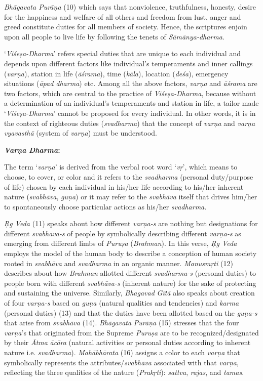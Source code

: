 \emph{Bhāgavata Purāṇa} (10) which says that nonviolence, truthfulness, honesty, desire for the happiness and welfare of all others and freedom from lust, anger and greed constitute duties for all members of society. Hence, the scriptures enjoin upon all people to live life by following the tenets of \emph{Sāmānya-dharma}.

`\emph{Viśeṣa-Dharma}' refers special duties that are unique to each individual and depends upon different factors like individual's temperaments and inner callings (\emph{varṇa}), station in life (\emph{āśrama}), time (\emph{kāla}), location (\emph{deśa}), emergency situations (\emph{āpad dharma}) etc. Among all the above factors, \emph{varṇa} and \emph{āśrama} are two factors, which are central to the practice of \emph{Viśeṣa-Dharma}, because without a determination of an individual's temperaments and station in life, a tailor made `\emph{Viśeṣa-Dharma}' cannot be proposed for every individual. In other words, it is in the context of righteous duties (\emph{svadharma}) that the concept of \emph{varṇa} and \emph{varṇa} \emph{vyavasthā} (system of \emph{varṇa}) must be understood.

\textbf{\emph{Varṇa} \emph{Dharma}:}

The term `\emph{varṇa}' is derived from the verbal root word `\emph{vṛ}', which means to choose, to cover, or color and it refers to the \emph{svadharma} (personal duty/purpose of life) chosen by each individual in his/her life according to his/her inherent nature (\emph{svabhāva}, \emph{guṇa}) or it may refer to the \emph{svabhāva} itself that drives him/her to spontaneously choose particular actions as his/her \emph{svadharma}.

\emph{Ṛg Veda} (11) speaks about how different \emph{varṇa-s} are nothing but designations for different \emph{svabhāva-s} of people by symbolically describing different \emph{varṇa-s} as emerging from different limbs of \emph{Puruṣa} (\emph{Brahman}). In this verse, \emph{Ṛg Veda} employs the model of the human body to describe a conception of human society rooted in \emph{svabhāva} and \emph{svadharma} in an organic manner. \emph{Manusmṛti} (12) describes about how \emph{Brahman} allotted different \emph{svadharma-s} (personal duties) to people born with different \emph{svabhāva-s} (inherent nature) for the sake of protecting and sustaining the universe. Similarly, \emph{Bhagavad} \emph{Gītā} also speaks about creation of four \emph{varṇa-s} based on \emph{guṇa} (natural qualities and tendencies) and \emph{karma} (personal duties) (13) and that the duties have been allotted based on the \emph{guṇa-s} that arise from \emph{svabhāva} (14). \emph{Bhāgavata} \emph{Purāṇa} (15) stresses that the four \emph{varṇa}'s that originated from the Supreme \emph{Puruṣa} are to be recognized/designated by their \emph{Ātma} \emph{ācāra} (natural activities or personal duties according to inherent nature i.e. \emph{svadharma}). \emph{Mahābhārata} (16) assigns a color to each \emph{varṇa} that symbolically represents the attributes/\emph{svabhāva} associated with that \emph{varṇa}, reflecting the three qualities of the nature (\emph{Prakṛti}): \emph{sattva}, \emph{rajas}, and \emph{tamas}.

